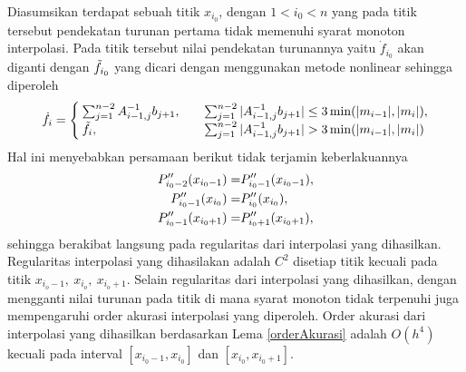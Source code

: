 Diasumsikan terdapat sebuah titik $x_{i_0}$, dengan $1 < i_0 < n$ yang pada titik tersebut pendekatan turunan pertama tidak memenuhi syarat monoton interpolasi. Pada titik tersebut nilai pendekatan turunannya yaitu $\dot{f}_{i_0}$ akan diganti dengan $\Tilde{f}_{i_0}$ yang dicari dengan menggunakan metode nonlinear sehingga diperoleh
\begin{gather*}
    \dot{f}_i = \begin{cases}
        \sum_{j=1}^{n-2}A_{i-1,j}^{-1}b_{j+1},\quad& \sum_{j=1}^{n-2}|A_{i-1,j}^{-1}b_{j+1}|\leq3\min(|m_{i-1}|,|m_i|), \\
        \Tilde{f}_i, \quad &\sum_{j=1}^{n-2}|A_{i-1,j}^{-1}b_{j+1}|>3\min(|m_{i-1}|,|m_i|)
    \end{cases}
\end{gather*}
Hal ini menyebabkan persamaan berikut tidak terjamin keberlakuannya
\begin{align}
    P_{i_0-2}''(x_{i_0-1}) =& P_{i_0-1}''(x_{i_0-1}),\notag\\
    P_{i_0-1}''(x_{i_0}) =& P_{i_0}''(x_{i_0}),\label{persTidakTerjamin}\\
    P_{i_0-1}''(x_{i_0+1}) =& P_{i_0+1}''(x_{i_0+1}),\notag
\end{align}
sehingga berakibat langsung pada regularitas dari interpolasi yang dihasilkan. Regularitas interpolasi yang dihasilakan adalah $C^2$ disetiap titik kecuali pada titik $x_{i_o-1},~x_{i_o},~x_{i_o+1}$. Selain regularitas dari interpolasi yang dihasilkan, dengan mengganti nilai turunan pada titik di mana syarat monoton tidak terpenuhi juga mempengaruhi order akurasi interpolasi yang diperoleh. Order akurasi dari interpolasi yang dihasilkan berdasarkan Lema \ref{orderAkurasi} adalah $O(h^4)$ kecuali pada interval $[x_{i_0-1}, x_{i_0}]$ dan $[x_{i_0}, x_{i_0+1}]$.

